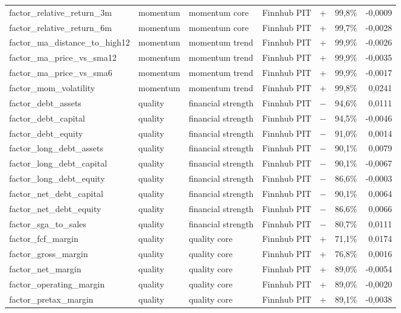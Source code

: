 \begin{longtable}{p{4.0cm}p{1.7cm}p{3.0cm}p{2.0cm}rrr}
factor\_relative\_return\_3m & momentum & momentum core & Finnhub PIT & + & 99,8\% & -0,0009 \\
factor\_relative\_return\_6m & momentum & momentum core & Finnhub PIT & + & 99,7\% & -0,0028 \\
factor\_ma\_distance\_to\_high12 & momentum & momentum trend & Finnhub PIT & + & 99,9\% & -0,0026 \\
factor\_ma\_price\_vs\_sma12 & momentum & momentum trend & Finnhub PIT & + & 99,9\% & -0,0035 \\
factor\_ma\_price\_vs\_sma6 & momentum & momentum trend & Finnhub PIT & + & 99,9\% & -0,0017 \\
factor\_mom\_volatility & momentum & momentum trend & Finnhub PIT & + & 99,8\% & 0,0241 \\
factor\_debt\_assets & quality & financial strength & Finnhub PIT & − & 94,6\% & 0,0111 \\
factor\_debt\_capital & quality & financial strength & Finnhub PIT & − & 94,5\% & -0,0046 \\
factor\_debt\_equity & quality & financial strength & Finnhub PIT & − & 91,0\% & 0,0014 \\
factor\_long\_debt\_assets & quality & financial strength & Finnhub PIT & − & 90,1\% & 0,0079 \\
factor\_long\_debt\_capital & quality & financial strength & Finnhub PIT & − & 90,1\% & -0,0067 \\
factor\_long\_debt\_equity & quality & financial strength & Finnhub PIT & − & 86,6\% & -0,0003 \\
factor\_net\_debt\_capital & quality & financial strength & Finnhub PIT & − & 90,1\% & 0,0064 \\
factor\_net\_debt\_equity & quality & financial strength & Finnhub PIT & − & 86,6\% & 0,0066 \\
factor\_sga\_to\_sales & quality & financial strength & Finnhub PIT & − & 80,7\% & 0,0111 \\
factor\_fcf\_margin & quality & quality core & Finnhub PIT & + & 71,1\% & 0,0174 \\
factor\_gross\_margin & quality & quality core & Finnhub PIT & + & 76,8\% & 0,0016 \\
factor\_net\_margin & quality & quality core & Finnhub PIT & + & 89,0\% & -0,0054 \\
factor\_operating\_margin & quality & quality core & Finnhub PIT & + & 89,0\% & -0,0020 \\
factor\_pretax\_margin & quality & quality core & Finnhub PIT & + & 89,1\% & -0,0038 \\

\end{longtable}
